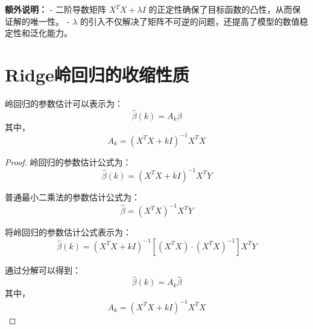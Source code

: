 \documentclass[lang=cn,11pt,a4paper]{elegantpaper}
\begin{document}
\textbf{额外说明：}
- 二阶导数矩阵 \(X^T X + \lambda I\) 的正定性确保了目标函数的凸性，从而保证解的唯一性。
- \(\lambda\) 的引入不仅解决了矩阵不可逆的问题，还提高了模型的数值稳定性和泛化能力。
\section{Ridge岭回归的收缩性质}
\begin{theorem}
    岭回归的参数估计可以表示为：
    \begin{equation}
    \hat{\beta}(k) = A_k \beta
    \end{equation}
    其中，
    \begin{equation}
    A_k = (X^T X + k I)^{-1} X^T X
    \end{equation}
    \end{theorem}
    
    \begin{proof}
    岭回归的参数估计公式为：
    \begin{equation}
    \hat{\beta}(k) = (X^T X + k I)^{-1} X^T Y
    \end{equation}
    
    普通最小二乘法的参数估计公式为：
    \begin{equation}
    \hat{\beta} = (X^T X)^{-1} X^T Y
    \end{equation}
    
    将岭回归的参数估计公式表示为：
    \begin{equation}
    \hat{\beta}(k) = (X^T X + k I)^{-1} \left[ (X^T X) \cdot (X^T X)^{-1} \right] X^T Y
    \end{equation}
    
    通过分解可以得到：
    \begin{equation}
    \hat{\beta}(k) = A_k \hat{\beta}
    \end{equation}
    其中，
    \begin{equation}
    A_k = (X^T X + k I)^{-1} X^T X
    \end{equation}
\end{proof}
\end{document}

